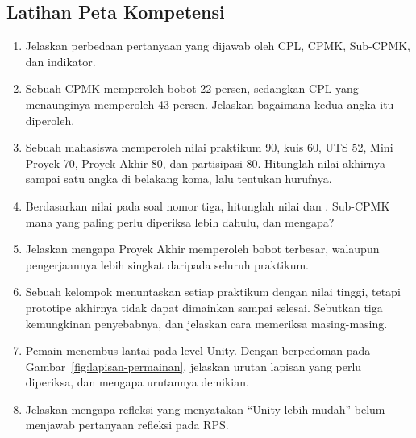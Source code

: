 
\subsection*{Latihan Peta Kompetensi}

\begin{enumerate}
  \item Jelaskan perbedaan pertanyaan yang dijawab oleh CPL, CPMK, Sub-CPMK,
        dan indikator.
  \item Sebuah CPMK memperoleh bobot 22 persen, sedangkan CPL yang menaunginya
        memperoleh 43 persen. Jelaskan bagaimana kedua angka itu diperoleh.
  \item Sebuah mahasiswa memperoleh nilai praktikum 90, kuis 60, UTS 52,
        Mini Proyek 70, Proyek Akhir 80, dan partisipasi 80. Hitunglah nilai
        akhirnya sampai satu angka di belakang koma, lalu tentukan hurufnya.
  \item Berdasarkan nilai pada soal nomor tiga, hitunglah nilai  dan
        . Sub-CPMK mana yang paling perlu diperiksa lebih dahulu, dan
        mengapa?
  \item Jelaskan mengapa Proyek Akhir memperoleh bobot terbesar, walaupun
        pengerjaannya lebih singkat daripada seluruh praktikum.
  \item Sebuah kelompok menuntaskan setiap praktikum dengan nilai tinggi,
        tetapi prototipe akhirnya tidak dapat dimainkan sampai selesai.
        Sebutkan tiga kemungkinan penyebabnya, dan jelaskan cara memeriksa
        masing-masing.
  \item Pemain menembus lantai pada level Unity. Dengan berpedoman pada
        Gambar~\ref{fig:lapisan-permainan}, jelaskan urutan lapisan yang perlu
        diperiksa, dan mengapa urutannya demikian.
  \item Jelaskan mengapa refleksi yang menyatakan ``Unity lebih mudah''
        belum menjawab pertanyaan refleksi pada RPS.
\end{enumerate}

